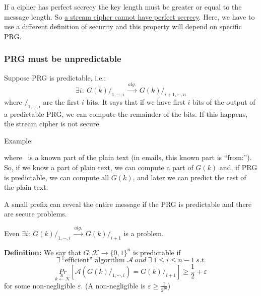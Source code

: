 \documentclass[12pt]{book}
\newcommand{\Def}{\textcolor{dkgreen}{\textbf{Definition:}} }
\begin{document}
If a cipher has perfect secrecy the key length must be greater or equal to the message length. So \underline{a stream cipher cannot have perfect secrecy}. Here, we have to use a different definition of security and this property will depend on specific PRG.

\subsubsection{PRG must be unpredictable}
Suppose PRG is predictable, i.e.: $$\exists i:\ G(k)/_{1,\cdots,i}\ \stackrel{alg.}{\longrightarrow}\ G(k)/_{i+1,\cdots,n}$$ where $/_{1,\cdots,i}$ are the first $i$ bits. It says that if we have first $i$ bits of the output of a predictable PRG, we can compute the remainder of the bits. If this happens, the stream cipher is not secure.

Example:
\begin{center}
\end{center}where \ is a known part of the plain text (in emails, this known part is ``from:''). So, if we know a part of plain text, we can compute a part of $G(k)$ and, if PRG is predictable, we can compute all $G(k)$, and later we can predict the rest of the plain text.

A small prefix can reveal the entire message if the PRG is predictable and there are secure problems.

Even $\exists i:\ G(k)/_{1,\cdots,i}\ \stackrel{alg.}{\longrightarrow}\ G(k)/_{i+1}$ is a problem.

\Def We say that $G:\mathcal{K}\longrightarrow \{0,1\}^{n}$ is predictable if $$\exists\ \text{``efficient'' algorithm } \mathcal{A}\ and\ \exists\ 1\leq i\leq n-1\ s.t.$$ $$ \underset{k\xleftarrow{R}\mathcal{K}}{Pr}[\mathcal{A}(G(k)/_{1,\cdots,i})=G(k)/_{i+1}]\geq \frac{1}{2}+\varepsilon$$ for some non-negligible $\varepsilon$. (A non-negligible is $\varepsilon\geq\frac{1}{2^{30}}$)
\end{document}
